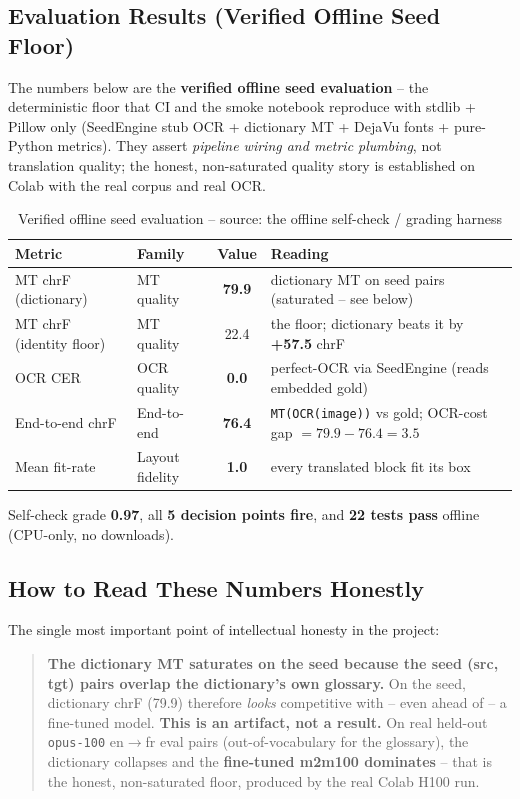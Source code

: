 \documentclass[12pt,a4paper]{article}
\begin{document}
\subsection{Evaluation Results (Verified Offline Seed Floor)}

The numbers below are the \textbf{verified offline seed evaluation} -- the deterministic floor that CI and the smoke notebook reproduce with stdlib + Pillow only (SeedEngine stub OCR + dictionary MT + DejaVu fonts + pure-Python metrics). They assert \emph{pipeline wiring and metric plumbing}, not translation quality; the honest, non-saturated quality story is established on Colab with the real corpus and real OCR.

\begin{table}[H]
\centering
\caption{Verified offline seed evaluation -- source: the offline self-check / grading harness}
\begin{tabular}{llcl}
\toprule
\textbf{Metric} & \textbf{Family} & \textbf{Value} & \textbf{Reading} \\
\midrule
MT chrF (dictionary) & MT quality & \textbf{79.9} & dictionary MT on seed pairs (saturated -- see below) \\
MT chrF (identity floor) & MT quality & 22.4 & the floor; dictionary beats it by \textbf{+57.5} chrF \\
OCR CER & OCR quality & \textbf{0.0} & perfect-OCR via SeedEngine (reads embedded gold) \\
End-to-end chrF & End-to-end & \textbf{76.4} & \texttt{MT(OCR(image))} vs gold; OCR-cost gap $= 79.9-76.4 = 3.5$ \\
Mean fit-rate & Layout fidelity & \textbf{1.0} & every translated block fit its box \\
\bottomrule
\end{tabular}
\end{table}

Self-check grade \textbf{0.97}, all \textbf{5 decision points fire}, and \textbf{22 tests pass} offline (CPU-only, no downloads).

\subsection{How to Read These Numbers Honestly}

The single most important point of intellectual honesty in the project:

\begin{quote}
\textbf{The dictionary MT saturates on the seed because the seed (src, tgt) pairs overlap the dictionary's own glossary.} On the seed, dictionary chrF (79.9) therefore \emph{looks} competitive with -- even ahead of -- a fine-tuned model. \textbf{This is an artifact, not a result.} On real held-out \texttt{opus-100} en$\rightarrow$fr eval pairs (out-of-vocabulary for the glossary), the dictionary collapses and the \textbf{fine-tuned m2m100 dominates} -- that is the honest, non-saturated floor, produced by the real Colab H100 run.
\end{quote}
\end{document}
